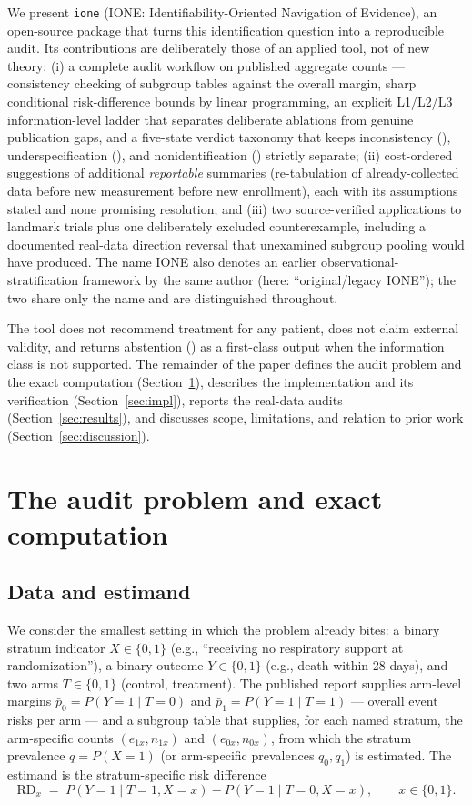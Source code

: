 \documentclass[article]{ajs}
\begin{document}
We present \texttt{ione} (IONE: Identifiability-Oriented Navigation of
Evidence), an open-source  package that turns this
identification question into a reproducible audit. Its contributions are
deliberately those of an applied tool, not of new theory: (i) a complete
audit workflow on published aggregate counts --- consistency checking of
subgroup tables against the overall margin, sharp conditional
risk-difference bounds by linear programming, an explicit L1/L2/L3
information-level ladder that separates deliberate ablations from
genuine publication gaps, and a five-state verdict
taxonomy that keeps inconsistency (), underspecification
(), and nonidentification () strictly
separate; (ii) cost-ordered suggestions of additional \emph{reportable}
summaries (re-tabulation of already-collected data before new measurement
before new enrollment), each with its assumptions stated and none
promising resolution; and (iii) two source-verified applications to
landmark trials plus one deliberately excluded counterexample,
including a documented real-data direction reversal that unexamined
subgroup pooling would have produced.
The name IONE also denotes an earlier observational-stratification
framework by the same author (here: ``original/legacy IONE''); the two
share only the name and are distinguished throughout.

The tool does not recommend treatment for any patient, does not claim
external validity, and returns abstention () as a
first-class output when the information class is not supported. The
remainder of the paper defines the audit problem and the exact
computation (Section~\ref{sec:methods}), describes the implementation and
its verification (Section~\ref{sec:impl}), reports the real-data audits
(Section~\ref{sec:results}), and discusses scope, limitations, and
relation to prior work (Section~\ref{sec:discussion}).

\section{The audit problem and exact computation}
\label{sec:methods}

\subsection{Data and estimand}

We consider the smallest setting in which the problem already bites: a
binary stratum indicator $X \in \{0,1\}$ (e.g., ``receiving no
respiratory support at randomization''), a binary outcome $Y \in \{0,1\}$
(e.g., death within 28 days), and two arms $T \in \{0,1\}$ (control,
treatment). The published report supplies arm-level margins
$\bar p_0 = P(Y{=}1 \mid T{=}0)$ and $\bar p_1 = P(Y{=}1 \mid T{=}1)$ ---
overall event risks per arm --- and a subgroup table that supplies, for
each named stratum, the arm-specific counts $(e_{1x}, n_{1x})$ and
$(e_{0x}, n_{0x})$, from which the stratum prevalence $q = P(X{=}1)$ (or
arm-specific prevalences $q_0, q_1$) is estimated. The estimand is the
stratum-specific risk difference
\[
\mathrm{RD}_x \;=\; P(Y{=}1 \mid T{=}1, X{=}x) - P(Y{=}1 \mid T{=}0, X{=}x),
\qquad x \in \{0,1\}.
\]
\end{document}
